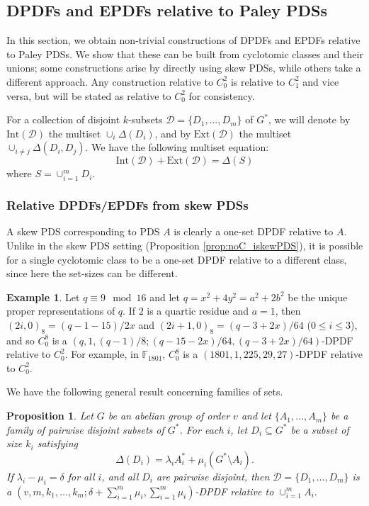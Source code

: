 \documentclass[12pt, a4paper]{article}
\newtheorem{proposition}[theorem]{Proposition}
\theoremstyle{definition}
\newtheorem{example}[theorem]{Example}
\begin{document}
\subsection{DPDFs and EPDFs relative to Paley PDSs}

In this section, we obtain non-trivial constructions of DPDFs and EPDFs relative to Paley PDSs. We show that these can be built from cyclotomic classes and their unions; some constructions arise by directly using skew PDSs, while others take a different approach.  Any construction relative to $C_0^2$ is relative to $C_1^2$ and vice versa, but will be stated as relative to $C_0^2$ for consistency. 

For a collection of disjoint $k$-subsets $\mathcal{D}=\{D_1,\ldots, D_m\}$ of $G^*$, we will denote by $\mathrm{Int}(\mathcal{D})$ the multiset $\cup_i \Delta(D_i)$, and by $\mathrm{Ext}(\mathcal{D})$ the multiset $\cup_{i \neq j} \Delta(D_i,D_j)$.  We have the following multiset equation:
$$ \mathrm{Int}(\mathcal{D}) + \mathrm{Ext}(\mathcal{D})=\Delta(S)$$
where $S=\cup_{i=1}^m D_i$.

\subsubsection{Relative DPDFs/EPDFs from skew PDSs}
A skew PDS corresponding to PDS $A$ is clearly a one-set DPDF relative to $A$.  Unlike in the skew PDS setting (Proposition \ref{prop:noC_iskewPDS}), it is possible for a single cyclotomic class to be a one-set DPDF relative to a different class, since here the set-sizes can be different.

\begin{example}
Let $q \equiv 9 \mod 16$ and let $q=x^2+4y^2=a^2+2b^2$ be the unique proper representations of \(q\). If $2$ is a quartic residue and $a=1$, then $(2i,0)_8=(q-1-15)/2x$ and $(2i+1,0)_8=(q-3+2x)/64$ ($0 \leq i \leq 3$), and so $C_0^8$ is a $(q,1,(q-1)/8;(q-15-2x)/64,(q-3+2x)/64)$-DPDF relative to $C_0^2$. For example, in $\mathbb{F}_{1801}$, $C_0^8$ is a $(1801,1,225,29,27)$-DPDF relative to $C_0^2$.
\end{example}

We have the following general result concerning families of sets.
\begin{proposition}\label{prop:generalPDSswap}
Let $G$ be an abelian group of order $v$ and let $\{A_1,\ldots, A_m\}$ be a family of pairwise disjoint subsets of $G^*$.
For each $i$, let $D_i\subseteq G^*$ be a subset of size $k_i$ satisfying
	\[
	\Delta(D_i)
	=
	\lambda_i A_i^*+\mu_i(G^*\setminus A_i).
	\]
	If
	$
	\lambda_i-\mu_i=\delta
	$
	for all $i$, and all $D_i$ are pairwise disjoint, then
	$
	\mathcal D=\{D_1,\ldots,D_m\}
	$ 
	is a
	$ 
	(v,m,k_1,\ldots,k_m;
	\delta+\sum_{i=1}^m\mu_i,\sum_{i=1}^m\mu_i)$-DPDF 
	relative to
	$\cup_{i=1}^m A_i.$ 
	
\end{proposition}
\end{document}
